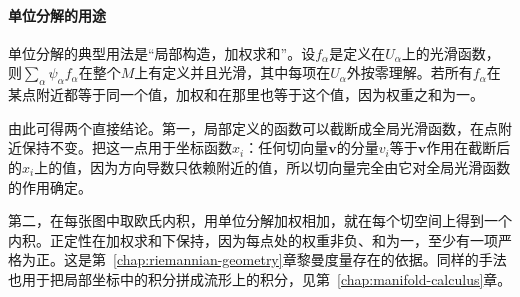 \paragraph{单位分解的用途}
单位分解的典型用法是“局部构造，加权求和”。设$f_\alpha$是定义在$U_\alpha$上的光滑函数，则$\sum_\alpha\psi_\alpha f_\alpha$在整个$M$上有定义并且光滑，其中每项在$U_\alpha$外按零理解。若所有$f_\alpha$在某点附近都等于同一个值，加权和在那里也等于这个值，因为权重之和为一。

由此可得两个直接结论。第一，局部定义的函数可以截断成全局光滑函数，在点附近保持不变。把这一点用于坐标函数$x_i$：任何切向量$\bm v$的分量$v_i$等于$\bm v$作用在截断后的$x_i$上的值，因为方向导数只依赖附近的值，所以切向量完全由它对全局光滑函数的作用确定。

第二，在每张图中取欧氏内积，用单位分解加权相加，就在每个切空间上得到一个内积。正定性在加权求和下保持，因为每点处的权重非负、和为一，至少有一项严格为正。这是第~\ref{chap:riemannian-geometry}章黎曼度量存在的依据。同样的手法也用于把局部坐标中的积分拼成流形上的积分，见第~\ref{chap:manifold-calculus}章。
